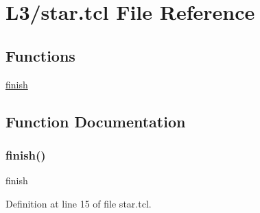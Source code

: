 \hypertarget{star_8tcl}{}\section{L3/star.tcl File Reference}
\label{star_8tcl}
\subsection*{Functions}
\begin{DoxyCompactItemize}
\item 
\hyperlink{star_8tcl_a30728837c246b65ef76298af0101d99c}{finish}
\end{DoxyCompactItemize}


\subsection{Function Documentation}
\mbox{\label{star_8tcl_a30728837c246b65ef76298af0101d99c}} 
\subsubsection{\texorpdfstring{finish()}{finish()}}
{\footnotesize\ttfamily finish}



Definition at line 15 of file star.\+tcl.

